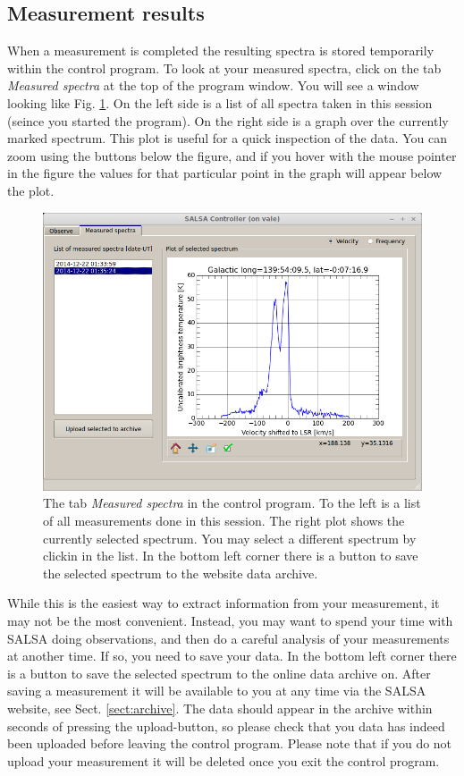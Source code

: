 \subsection{Measurement results}
\label{sect:inspect}
When a measurement is completed the resulting spectra is stored temporarily
within the control program.  To look at your measured spectra, click on the tab
\emph{Measured spectra} at the top of the program window. You will see a window
looking like Fig.  \ref{fig:controlspectra}. On the left side is a list of all
spectra taken in this session (seince you started the program). On the right
side is a graph over the currently marked spectrum. This plot is useful for
a quick inspection of the data. You can zoom using the buttons below the figure,
and if you hover with the mouse pointer in the figure the values for that particular point
in the graph will appear below the plot. 
\begin{figure}[ht]
\begin{center}
\includegraphics[width=\textwidth]{../figures/Controller_spectra.png}
\end{center}
\caption{The tab \emph{Measured spectra} in the control program. To the left is
	a list of all measurements done in this session. The right plot shows the
	currently selected spectrum. You may select a different spectrum by clickin
	in the list. In the bottom left corner there is a button to save the
selected spectrum to the website data archive.}
\label{fig:controlspectra}
\end{figure}
While this is the easiest way to extract information from your measurement, it
may not be the most convenient. Instead, you may want to spend your time with
SALSA doing observations, and then do a careful analysis of your measurements
at another time. If so, you need to save your data.  In the bottom left corner
there is a button to save the selected spectrum to the online data archive on.
After saving a measurement it will be available to you at any time via the
SALSA website, see Sect.  \ref{sect:archive}. The data should appear in the archive
within seconds of pressing the upload-button, so please check that you data has indeed been
uploaded before leaving the control program. Please note that if you do not
upload your measurement it will be deleted once you exit the control program.

